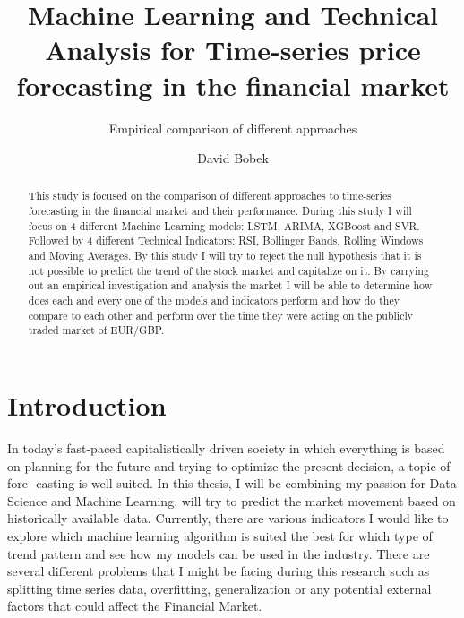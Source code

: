 \documentclass{imc-inf}
\title{Machine Learning and Technical Analysis for Time-series price forecasting in the financial market}
\subtitle{Empirical comparison of different approaches}
\author{David Bobek}
\begin{document}
	\frontmatter
	\maketitle
	
	\begin{declarations}\end{declarations}
	
	
	\begin{abstract}
		This study is focused on the comparison of different approaches to time-series forecasting in the financial market and their performance.
		During this study I will focus on 4 different Machine Learning models: LSTM, ARIMA, XGBoost and SVR. Followed by 4 different Technical Indicators: RSI, Bollinger Bands, Rolling Windows and Moving Averages.
		By this study I will try to reject the null hypothesis that it is not possible to predict the trend of the stock market and capitalize on it. By carrying out an empirical
		investigation and analysis the market I will be able to determine how does each and every one of the models and indicators perform and how do they compare to each other and perform 
		over the time they were acting on the publicly traded market of EUR/GBP.
		
		
	\end{abstract}
	
	
	
	\tableofcontents%
	\clearpage
	
	
	\listoftables
	\clearpage
	
	
	\listoffigures
	\clearpage
	
	
	\mainmatter%
	
	\chapter{Introduction}\label{chap:introduction}
	
	In today’s fast-paced capitalistically driven society in which everything is based on
	planning for the future and trying to optimize the present decision, a topic of fore-
	casting is well suited. In this thesis, I will be combining my passion for Data Science
	and Machine Learning. will try to predict the market movement based on historically available data.
	Currently, there are various indicators I would like to explore
	which machine learning algorithm is suited the best for which type of trend pattern
	and see how my models can be used in the industry. There are several different
	problems that I might be facing during this research such as splitting time series data, overfitting,
	generalization or any potential external factors that could affect the Financial Market.
	
\end{document}

